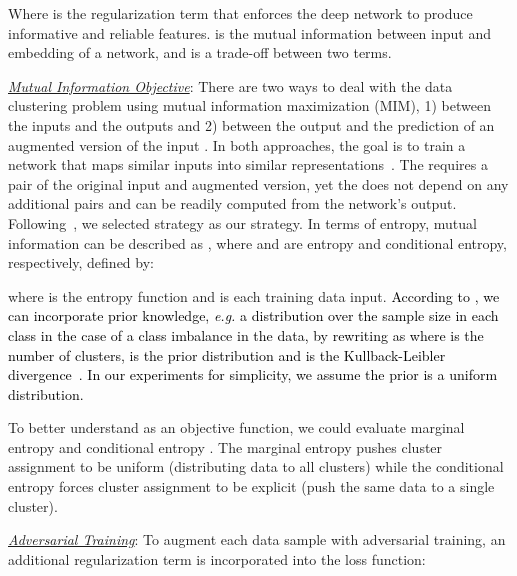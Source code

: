\documentclass[letterpaper, 10 pt, journal, twoside]{IEEEtran}
\newcommand{\eg}{\emph{e.g.}\xspace}
\newcommand{\revised}{\textcolor{black}}{}
\begin{document}
\vspace*{-0.75em}

\vspace*{-1.0em}


Where \revised{} is the regularization term that enforces the deep network to produce informative and reliable features.  is the mutual information between input and embedding of a network, and  is a trade-off between two terms.

\underline{\emph{Mutual Information Objective}}: 
There are two ways to deal with the data clustering problem using mutual information maximization (MIM), 1)  between the inputs  and the outputs  and 2)  between the output  and the prediction of an augmented version of the input . In both approaches, the goal is to train a network that maps similar inputs into similar representations~\cite{IMSAT,IIC}. The  requires a pair of the original input and augmented version, yet the  does not depend on any additional pairs and can be readily computed from the network's output. Following~\cite{IMSAT}, we selected  strategy as our strategy. In terms of entropy, mutual information can be described as , where  and  are entropy and conditional entropy, respectively, defined by:

\vspace*{-0.75em}

\vspace*{-0.75em}

\vspace*{-1.0em}

where  is the entropy function and  is each training data input. \revised{According to \cite{Gomes_RIM}, we can incorporate prior knowledge, \eg a distribution over the sample size in each class in the case of a class imbalance in the data, by rewriting  as  where  is the number of clusters,  is the prior distribution and  is the Kullback-Leibler divergence~\cite{KLD}. In our experiments for simplicity, we assume the prior  is a uniform distribution.} \par
To better understand  as an objective function, we could evaluate marginal entropy  and conditional entropy . The marginal entropy pushes cluster assignment to be uniform (distributing data to all clusters) while the conditional entropy forces cluster assignment to be explicit (push the same data to a single cluster).\par

\underline{\emph{Adversarial Training}}: To augment each data sample with adversarial training,  an additional regularization term  is incorporated into the loss function:
\end{document}
